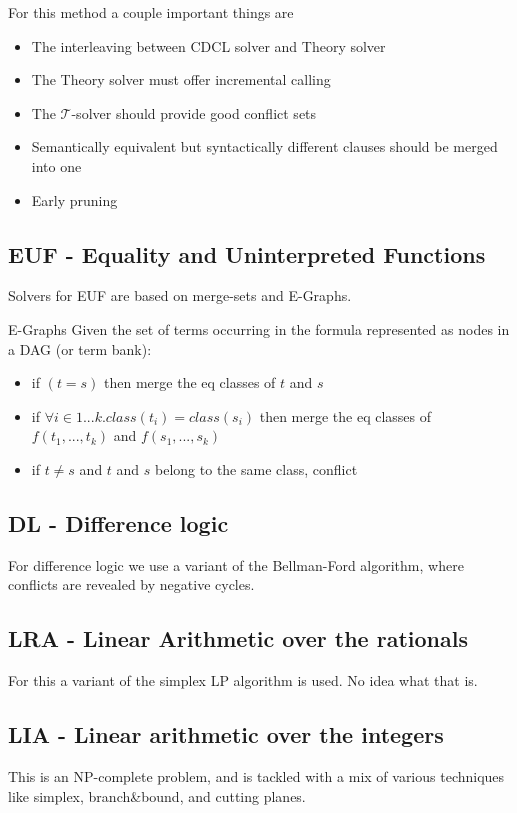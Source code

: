 \documentclass{article}
\begin{document}
For this method a couple important things are
\begin{itemize}
    \item The interleaving between CDCL solver and Theory solver
    \item The Theory solver must offer incremental calling
    \item The $\mathcal T$-solver should provide good conflict sets
    \item Semantically equivalent but syntactically different clauses should be merged into one
    \item Early pruning
\end{itemize}

\subsection*{EUF - Equality and Uninterpreted Functions}
Solvers for EUF are based on merge-sets and E-Graphs.
\begin{callout}{E-Graphs}
    Given the set of terms occurring in the formula represented as nodes in a DAG (or term bank):
    \begin{itemize}
        \item if $(t=s)$ then merge the eq classes of $t$ and $s$
        \item if $\forall i\in 1...k. class(t_i)=class(s_i)$ then merge the eq classes of $f(t_1,...,t_k)$ and $f(s_1,...,s_k)$
        \item if $t\neq s$ and $t$ and $s$ belong to the same class, conflict
    \end{itemize}
\end{callout}

\subsection*{DL - Difference logic}
For difference logic we use a variant of the Bellman-Ford algorithm, where conflicts are revealed by negative cycles.

\subsection*{LRA - Linear Arithmetic over the rationals}
For this a variant of the simplex LP algorithm is used. No idea what that is.

\subsection*{LIA - Linear arithmetic over the integers}
This is an NP-complete problem, and is tackled with a mix of various techniques like simplex, branch\&bound, and cutting planes.
\end{document}
